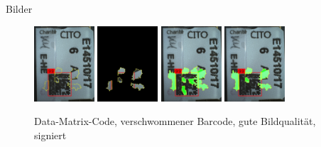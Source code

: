 \documentclass{beamer}
\begin{document}
  \begin{frame}{Bilder}
    \begin{figure}
      \includegraphics[width=0.2\textwidth]{./assets/E2017014510P6-A-1_E-HE_000000000000A3B3-label_top1_positiveonlywithrest.jpg}
      \hfill
      \includegraphics[width=0.2\textwidth]{./assets/E2017014510P6-A-1_E-HE_000000000000A3B3-label_top1_positiveonly.jpg}
      \hfill
      \includegraphics[width=0.2\textwidth]{./assets/E2017014510P6-A-1_E-HE_000000000000A3B3-label_top1_proscons.jpg}
      \hfill
      \includegraphics[width=0.2\textwidth]{./assets/E2017014510P6-A-1_E-HE_000000000000A3B3-label_top1_prosconsminweight.jpg}
      \caption{Data-Matrix-Code, verschwommener Barcode, gute Bildqualität, signiert}
    \end{figure}
  \end{frame}
\end{document}
